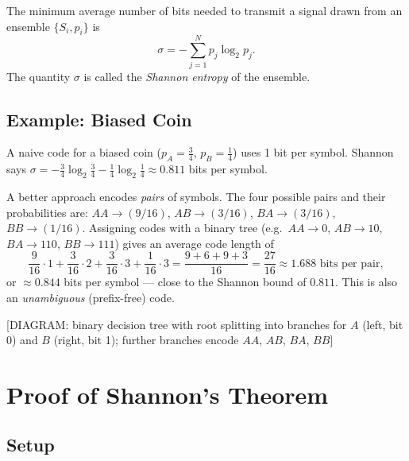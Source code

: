 \begin{theorem}
The minimum average number of bits needed to transmit a signal drawn from an ensemble $\{S_i, p_i\}$ is
\begin{equation}
    \sigma = -\sum_{j=1}^{N} p_j \log_2 p_j.
\end{equation}
The quantity $\sigma$ is called the \emph{Shannon entropy} of the ensemble.
\end{theorem}

\subsection{Example: Biased Coin}

A naive code for a biased coin ($p_A = \tfrac{3}{4}$, $p_B = \tfrac{1}{4}$) uses 1 bit per symbol. Shannon says $\sigma = -\tfrac{3}{4}\log_2\tfrac{3}{4} - \tfrac{1}{4}\log_2\tfrac{1}{4} \approx 0.811$ bits per symbol.

A better approach encodes \emph{pairs} of symbols. The four possible pairs and their probabilities are: $AA \to (9/16)$, $AB \to (3/16)$, $BA \to (3/16)$, $BB \to (1/16)$. Assigning codes with a binary tree (e.g.\ $AA\to 0$, $AB\to 10$, $BA\to 110$, $BB\to 111$) gives an average code length of
\begin{equation}
    \frac{9}{16}\cdot 1 + \frac{3}{16}\cdot 2 + \frac{3}{16}\cdot 3 + \frac{1}{16}\cdot 3 = \frac{9 + 6 + 9 + 3}{16} = \frac{27}{16} \approx 1.688 \text{ bits per pair},
\end{equation}
or $\approx 0.844$ bits per symbol — close to the Shannon bound of $0.811$. This is also an \emph{unambiguous} (prefix-free) code.

\begin{center}[DIAGRAM: binary decision tree with root splitting into branches for $A$ (left, bit 0) and $B$ (right, bit 1); further branches encode $AA$, $AB$, $BA$, $BB$]\end{center}

\section{Proof of Shannon's Theorem}

\subsection{Setup}

